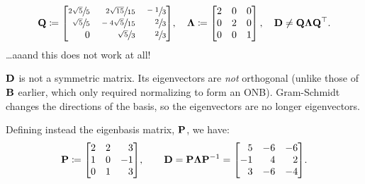 \documentclass[11pt]{article}
\begin{document}
\begin{enumerate}
\begin{enumerate}[align=left]
\[                        \mat{Q}
                        \coloneq
                        \begin{bmatrix*}[r]
                            \sfrac{2 \sqrt{5}}{5} & \sfrac{2 \sqrt{15}}{15} & \sfrac{-1}{3} \\
                            \sfrac{\sqrt{5}}{5}   & \sfrac{-4\sqrt{5}}{15}  & \sfrac{2}{3} \\
                            0                     & \sfrac{\sqrt{5}}{3}     & \sfrac{2}{3} \\
                        \end{bmatrix*}
                        \! ,
                        \quad
                        \mat{\Lambda}
                        \coloneq
                        \begin{bmatrix}
                            2 & 0 & 0 \\
                            0 & 2 & 0 \\
                            0 & 0 & 1 \\
                        \end{bmatrix}
                        ,
                        \quad
                        \mat{D} \neq \mat{Q} \mat{\Lambda} \mat{Q}^\top.
                    \]
                    \dots aaand this does not work at all!

                    $\mathbf{D}$ is not a symmetric matrix.  Its eigenvectors are \emph{not} orthogonal
                    (unlike those of $\mathbf{B}$ earlier, which only required normalizing to form an
                    ONB).  Gram-Schmidt changes the directions of the basis, so the eigenvectors are
                    no longer eigenvectors.

                    Defining instead the eigenbasis matrix, $\mathbf{P}$, we have:
                    \[
                        \mat{P}
                        \coloneq
                        \begin{bmatrix*}[r]
                            2 & 2 & 3 \\
                            1 & 0 & -1 \\
                            0 & 1 & 3 \\
                        \end{bmatrix*}
                        \! ,
                        \qquad
                        \mat{D} = \mat{P} \mat{\Lambda} \mat{P}^{-1}
                        =
                        \begin{bmatrix*}[r]
                            5  & -6 & -6 \\
                            -1 & 4  & 2  \\
                            3  & -6 & -4 \\
                        \end{bmatrix*}
                        \! .
                    \]


\end{enumerate}
\end{enumerate}
\end{document}
